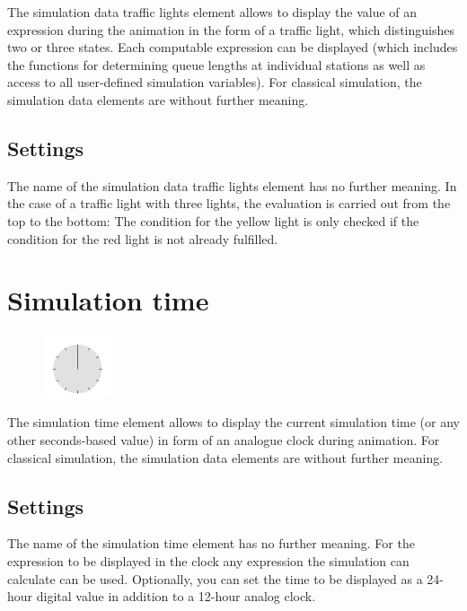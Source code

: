 The simulation data traffic lights element allows to display the value of an expression during the animation
in the form of a traffic light, which distinguishes two or three states. Each computable expression can be
displayed (which includes the functions for determining queue lengths at individual stations as well as
access to all user-defined simulation variables). For classical simulation, the simulation data elements
are without further meaning.

\subsection*{Settings}

The name of the simulation data traffic lights element has no further meaning.
In the case of a traffic light with three lights, the evaluation is carried out from the top to the bottom:
The condition for the yellow light is only checked if the condition for the red light is not already fulfilled.


\section{Simulation time}
\label{ref:ModelElementAnimationClock}

\begin{figure}
\vspace{-22pt}
\includegraphics[width=2cm]{imageModelElementAnimationClock.png}
\vspace{-22pt}
\end{figure}

The simulation time element allows to display the current simulation time
(or any other seconds-based value) in form of an analogue clock during animation.
For classical simulation, the simulation data elements are without further meaning.

\subsection*{Settings}

The name of the simulation time element has no further meaning.
For the expression to be displayed in the clock any expression the simulation can calculate can be used.
Optionally, you can set the time to be displayed as a 24-hour digital value in addition to a 12-hour analog clock.


